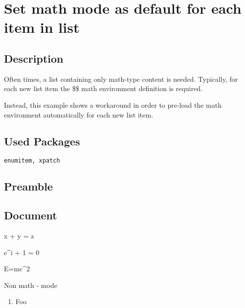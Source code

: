 \documentclass{article}
\begin{document}
	
	\section*{Set math mode as default for each item in list}%
	
	\subsection*{Description}
	Often times, a list containing only math-type content is needed. Typically, for each new list item the \$\$ math environment definition is required.
	
	Instead, this example shows a workaround in order to pre-load the math environment automatically for each new list item.
		
	\subsection*{Used Packages}
	\verb|enumitem, xpatch|
	
	\subsection*{Preamble}
	
	\begin{latex}
	\usepackage{enumitem} %
	\usepackage{xpatch} %
	\end{latex}
	
	\subsection*{Document}
	\begin{latex}
		\begin{mathlist}
			\item x + y = z
			\item e^{i\pi} + 1 = 0
			\item E=mc^2
			\item \)Non math - mode %
		\end{mathlist}
		\begin{enumerate}
			\item Foo %
		\end{enumerate}
	\end{latex}
	
\end{document}
